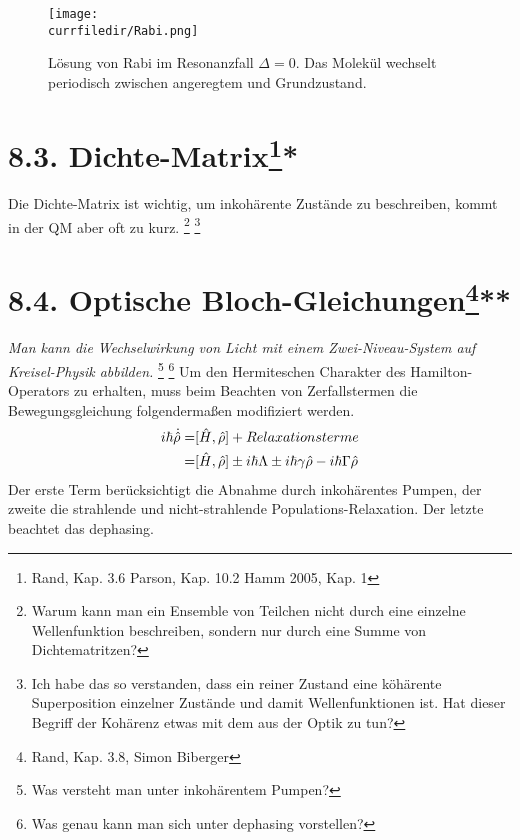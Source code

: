 \begin{figure}
    \centering
    \texttt{[image: \\currfiledir/Rabi.png]}
    \caption{Lösung von Rabi im Resonanzfall $\Delta = 0$. Das Molekül wechselt periodisch zwischen angeregtem und Grundzustand.}
    \label{fig:rabi}
\end{figure}

\section{8.3. Dichte-Matrix\protect\footnote{Rand,  Kap. 3.6 \newline Parson, Kap. 10.2 \newline Hamm 2005, Kap. 1}\hfill **} 

Die Dichte-Matrix ist wichtig, um inkohärente Zustände zu
beschreiben, kommt in der QM aber oft zu kurz. \footnote{Warum kann man ein Ensemble von Teilchen nicht durch eine einzelne Wellenfunktion beschreiben, sondern nur durch eine Summe von Dichtematritzen?}
\footnote{Ich habe das so verstanden, dass ein reiner Zustand eine köhärente Superposition einzelner Zustände und damit Wellenfunktionen ist. Hat dieser Begriff der Kohärenz etwas mit dem aus der Optik zu tun?}

\section{8.4. Optische Bloch-Gleichungen\protect\footnote{Rand, Kap. 3.8, Simon Biberger}\hfill ***} 

\textit{Man kann die Wechselwirkung von Licht mit einem
Zwei-Niveau-System auf Kreisel-Physik abbilden.}
\footnote{Was versteht man unter inkohärentem Pumpen?}
\footnote{Was genau kann man sich unter dephasing vorstellen?}
Um den Hermiteschen Charakter des Hamilton-Operators zu erhalten, muss beim Beachten von Zerfallstermen die Bewegungsgleichung folgendermaßen modifiziert werden.
\begin{align}
    i\hbar \dot{\hat{\rho}} =& [\hat{H},\hat{\rho}] + Relaxationsterme \notag\\
    =& [\hat{H},\hat{\rho}] \pm i\hbar\Lambda \pm i\hbar\gamma \hat{\rho} - i\hbar \Gamma \hat{\rho}
\end{align}
Der erste Term berücksichtigt die Abnahme durch inkohärentes Pumpen, der zweite die strahlende und nicht-strahlende Populations-Relaxation. Der letzte beachtet das dephasing. %

